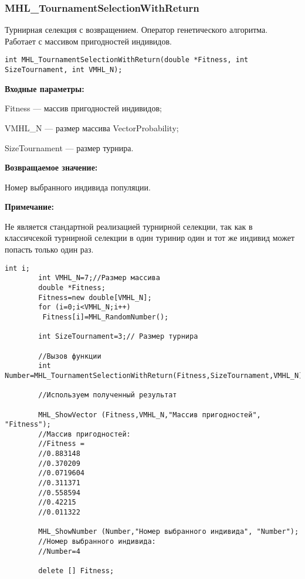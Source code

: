 \documentclass[a4paper,12pt]{article}
\begin{document}
\subsubsection{MHL\_TournamentSelectionWithReturn}\label{MHL_TournamentSelectionWithReturn}

Турнирная селекция с возвращением. Оператор генетического алгоритма. Работает с массивом пригодностей индивидов.


\begin{lstlisting}[label=code_syntax_MHL_TournamentSelectionWithReturn,caption=Синтаксис]
int MHL_TournamentSelectionWithReturn(double *Fitness, int SizeTournament, int VMHL_N);
\end{lstlisting}

\textbf{Входные параметры:}
 
Fitness --- массив пригодностей индивидов;
 
VMHL\_N --- размер массива VectorProbability;
 
SizeTournament --- размер турнира.

\textbf{Возвращаемое значение:} 

 Номер выбранного индивида популяции.

\textbf{Примечание:}

 Не является стандартной реализацией турнирной селекции, так как в классичсекой турнирной селекции в один туринир один и тот же индивид может попасть только один раз.




\begin{lstlisting}[label=code_use_MHL_TournamentSelectionWithReturn,caption=Пример использования]
        int i;
        int VMHL_N=7;//Размер массива
        double *Fitness;
        Fitness=new double[VMHL_N];
        for (i=0;i<VMHL_N;i++)
         Fitness[i]=MHL_RandomNumber();

        int SizeTournament=3;// Размер турнира

        //Вызов функции
        int Number=MHL_TournamentSelectionWithReturn(Fitness,SizeTournament,VMHL_N);

        //Используем полученный результат

        MHL_ShowVector (Fitness,VMHL_N,"Массив пригодностей", "Fitness");
        //Массив пригодностей:
        //Fitness =	
        //0.883148
        //0.370209
        //0.0719604
        //0.311371
        //0.558594
        //0.42215
        //0.011322

        MHL_ShowNumber (Number,"Номер выбранного индивида", "Number");
        //Номер выбранного индивида:
        //Number=4

        delete [] Fitness;
\end{lstlisting}
\end{document}
